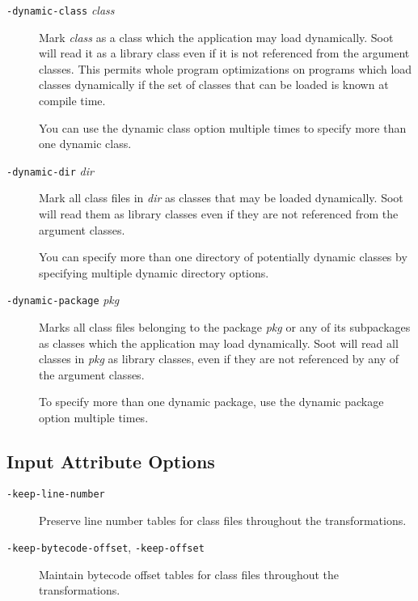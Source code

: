 \documentclass{article}
\begin{document}
\begin{description}
  \item[
  {\tt -dynamic-class}{ \it class}]


\par

Mark {\it class} as a class which the application may load
dynamically. Soot will read it as a library class even if it is
not referenced from the argument classes.  This permits whole
program optimizations on programs which load classes dynamically
if the set of classes that can be loaded is known at compile
time.

\par

You can use the dynamic class option multiple
times to specify more than one dynamic class.



  \item[
  {\tt -dynamic-dir}{ \it dir}]


\par
Mark all class files in {\it dir} as classes that may
be loaded dynamically. Soot will read them as library classes
even if they are not referenced from the argument classes. 

\par

You can specify more than one directory of potentially dynamic
classes by specifying multiple dynamic directory options.



  \item[
  {\tt -dynamic-package}{ \it pkg}]


\par

Marks all class files belonging to the package {\it pkg}
or any of its subpackages as classes which the application may
load dynamically. Soot will read all classes in {\it pkg} as
library classes, even if they are not referenced by any of the
argument classes. 

\par
To specify more than one dynamic package, use the dynamic
package option multiple times.



\end{description}


\subsection{Input Attribute Options}


\begin{description}

  \item[
  {\tt -keep-line-number}]

Preserve line number tables for class files throughout the
transformations.



  \item[
  {\tt -keep-bytecode-offset}, 
  {\tt -keep-offset}]
Maintain bytecode offset tables for class files throughout the transformations.


\end{description}
\end{document}
